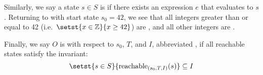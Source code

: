 Similarly, we say a state $s \in S$ is \sTIreachable{} if there exists an
\sTIreachable{} expression $e$ that evaluates to $s$. Returning to
 with start state $s_0 = 42$, we see that all integers greater
than or equal to 42 (i.e.\ $\setst{x \in \ints}{x \geq 42}$) are
\sTIreachable{}, and all other integers are \sTIunreachable{}.

Finally, we say $O$ is  with respect to $s_0$,
$T$, and $I$, abbreviated , if all reachable states
satisfy the invariant:
\[
  \setst{s \in S}{\sTIreachablepredicate{s}} \subseteq I
\]
